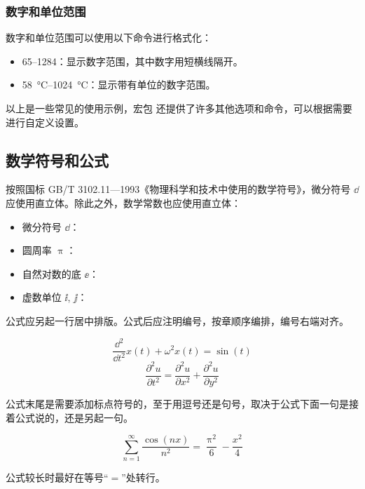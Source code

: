 \subsubsection*{数字和单位范围}

数字和单位范围可以使用以下命令进行格式化：

\begin{itemize}
  \item \numrange{65}{1284}：显示数字范围，其中数字用短横线隔开。
  \item \SIrange{58}{1024}{\degreeCelsius}：显示带有单位的数字范围。
\end{itemize}

以上是一些常见的使用示例，宏包  还提供了许多其他选项和命令，可以根据需要进行自定义设置。

\subsection{数学符号和公式}

按照国标 GB/T 3102.11—1993《物理科学和技术中使用的数学符号》，微分符号 $\dd$ 应使用直立体。除此之外，数学常数也应使用直立体：

\begin{itemize}
  \item 微分符号 $\dd$：
  \item 圆周率 $\uppi$：
  \item 自然对数的底 $\ee$：
  \item 虚数单位 $\ii$, $\jj$： 
\end{itemize}

公式应另起一行居中排版。公式后应注明编号，按章顺序编排，编号右端对齐。

\begin{equation}
  \frac{\dd^2}{\dd t^2}x(t)+\omega^2x(t)=\sin(t)
\end{equation}
\begin{equation}
  \frac{\partial^2u}{\partial t^2}=\frac{\partial^2u}{\partial x^2}+\frac{\partial^2u}{\partial y^2}
\end{equation}

公式末尾是需要添加标点符号的，至于用逗号还是句号，取决于公式下面一句是接着公式说的，还是另起一句。

\begin{equation}
  \sum_{n=1}^{\infty}\frac{\cos(nx)}{n^2}=\frac{\uppi^2}{6}-\frac{x^2}{4}
\end{equation}

公式较长时最好在等号“$=$”处转行。

